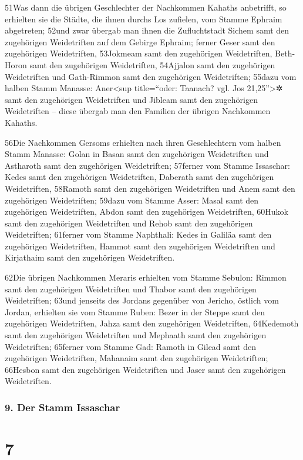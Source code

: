 51Was dann die übrigen Geschlechter der Nachkommen Kahaths anbetrifft,
so erhielten sie die Städte, die ihnen durchs Los zufielen, vom Stamme
Ephraim abgetreten; 52und zwar übergab man ihnen die Zufluchtstadt
Sichem samt den zugehörigen Weidetriften auf dem Gebirge Ephraim; ferner
Geser samt den zugehörigen Weidetriften, 53Jokmeam samt den zugehörigen
Weidetriften, Beth-Horon samt den zugehörigen Weidetriften, 54Ajjalon
samt den zugehörigen Weidetriften und Gath-Rimmon samt den zugehörigen
Weidetriften; 55dazu vom halben Stamm Manasse: Aner\textless sup
title=``oder: Taanach? vgl. Jos 21,25''\textgreater✲ samt den
zugehörigen Weidetriften und Jibleam samt den zugehörigen Weidetriften
-- diese übergab man den Familien der übrigen Nachkommen Kahaths.

56Die Nachkommen Gersoms erhielten nach ihren Geschlechtern vom halben
Stamm Manasse: Golan in Basan samt den zugehörigen Weidetriften und
Astharoth samt den zugehörigen Weidetriften; 57ferner vom Stamme
Issaschar: Kedes samt den zugehörigen Weidetriften, Daberath samt den
zugehörigen Weidetriften, 58Ramoth samt den zugehörigen Weidetriften und
Anem samt den zugehörigen Weidetriften; 59dazu vom Stamme Asser: Masal
samt den zugehörigen Weidetriften, Abdon samt den zugehörigen
Weidetriften, 60Hukok samt den zugehörigen Weidetriften und Rehob samt
den zugehörigen Weidetriften; 61ferner vom Stamme Naphthali: Kedes in
Galiläa samt den zugehörigen Weidetriften, Hammot samt den zugehörigen
Weidetriften und Kirjathaim samt den zugehörigen Weidetriften.

62Die übrigen Nachkommen Meraris erhielten vom Stamme Sebulon: Rimmon
samt den zugehörigen Weidetriften und Thabor samt den zugehörigen
Weidetriften; 63und jenseits des Jordans gegenüber von Jericho, östlich
vom Jordan, erhielten sie vom Stamme Ruben: Bezer in der Steppe samt den
zugehörigen Weidetriften, Jahza samt den zugehörigen Weidetriften,
64Kedemoth samt den zugehörigen Weidetriften und Mephaath samt den
zugehörigen Weidetriften; 65ferner vom Stamme Gad: Ramoth in Gilead samt
den zugehörigen Weidetriften, Mahanaim samt den zugehörigen
Weidetriften; 66Hesbon samt den zugehörigen Weidetriften und Jaser samt
den zugehörigen Weidetriften.

\hypertarget{der-stamm-issaschar}{%
\subsubsection{9. Der Stamm Issaschar}\label{der-stamm-issaschar}}

\hypertarget{section-6}{%
\section{7}\label{section-6}}

